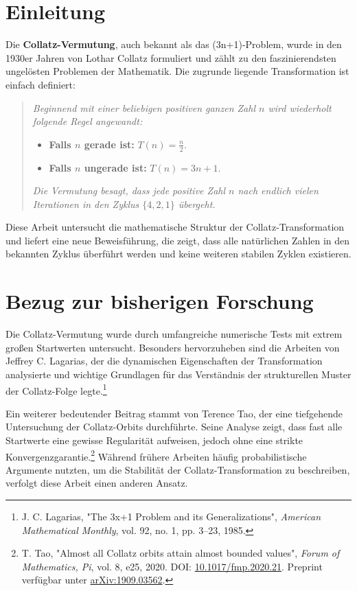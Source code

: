 \documentclass[a4paper,12pt]{article}
\begin{document}
\section{Einleitung}
Die \textbf{Collatz-Vermutung}, auch bekannt als das (3n+1)-Problem, wurde in den 1930er Jahren von Lothar Collatz formuliert und zählt zu den faszinierendsten ungelösten Problemen der Mathematik. Die zugrunde liegende Transformation ist einfach definiert:

\begin{quote}
\textit{Beginnend mit einer beliebigen positiven ganzen Zahl \( n \) wird wiederholt folgende Regel angewandt:}
\begin{itemize}
    \item \textbf{Falls \( n \) gerade ist:} \( T(n) = \frac{n}{2} \).
    \item \textbf{Falls \( n \) ungerade ist:} \( T(n) = 3n + 1 \).
\end{itemize}
\textit{Die Vermutung besagt, dass jede positive Zahl \( n \) nach endlich vielen Iterationen in den Zyklus \( \{4, 2, 1\} \) übergeht.}
\end{quote}

Diese Arbeit untersucht die mathematische Struktur der Collatz-Transformation und liefert eine neue Beweisführung, die zeigt, dass alle natürlichen Zahlen in den bekannten Zyklus überführt werden und keine weiteren stabilen Zyklen existieren.



\section{Bezug zur bisherigen Forschung}
Die Collatz-Vermutung wurde durch umfangreiche numerische Tests mit extrem großen Startwerten untersucht. Besonders hervorzuheben sind die Arbeiten von Jeffrey C. Lagarias, der die dynamischen Eigenschaften der Transformation analysierte und wichtige Grundlagen für das Verständnis der strukturellen Muster der Collatz-Folge legte.\footnote{J. C. Lagarias, "The 3x+1 Problem and its Generalizations", \textit{American Mathematical Monthly}, vol. 92, no. 1, pp. 3–23, 1985.} 

Ein weiterer bedeutender Beitrag stammt von Terence Tao, der eine tiefgehende Untersuchung der Collatz-Orbits durchführte. Seine Analyse zeigt, dass fast alle Startwerte eine gewisse Regularität aufweisen, jedoch ohne eine strikte Konvergenzgarantie.\footnote{T. Tao, "Almost all Collatz orbits attain almost bounded values", \textit{Forum of Mathematics, Pi}, vol. 8, e25, 2020. DOI: \href{https://doi.org/10.1017/fmp.2020.21}{10.1017/fmp.2020.21}. Preprint verfügbar unter \href{https://arxiv.org/abs/1909.03562}{arXiv:1909.03562}.} Während frühere Arbeiten häufig probabilistische Argumente nutzten, um die Stabilität der Collatz-Transformation zu beschreiben, verfolgt diese Arbeit einen anderen Ansatz.
\end{document}
